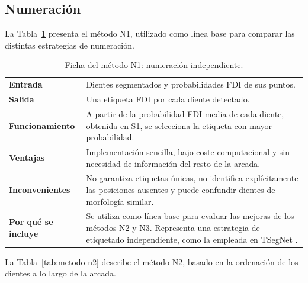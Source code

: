 \subsection{Numeración}
\label{subsec:metodos-numeracion}

La Tabla~\ref{tab:metodo-n1} presenta el método N1, utilizado como línea base para comparar las distintas estrategias de numeración.

\begin{table}[htbp]
    \centering
    \begin{tabular}{p{} >{\raggedright\arraybackslash}p{}}
         \hline 
         \textbf{Entrada} &
         Dientes segmentados y probabilidades FDI de sus puntos. \\

         \textbf{Salida} &
         Una etiqueta FDI por cada diente detectado. \\

         \textbf{Funcionamiento} &
         A partir de la probabilidad FDI media de cada diente, obtenida en S1, se selecciona la etiqueta con mayor probabilidad. \\

         \textbf{Ventajas} &
         Implementación sencilla, bajo coste computacional y sin necesidad de información del resto de la arcada. \\

         \textbf{Inconvenientes} &
         No garantiza etiquetas únicas, no identifica explícitamente las posiciones ausentes y puede confundir dientes de morfología similar. \\

         \textbf{Por qué se incluye} &
         Se utiliza como línea base para evaluar las mejoras de los métodos N2 y N3. Representa una estrategia de etiquetado independiente, como la empleada en TSegNet \cite{cuiTSegNetEfficientAccurate2021}. \\
         \hline
    \end{tabular}
    \caption{Ficha del método N1: numeración independiente.}
    \label{tab:metodo-n1}
\end{table}

La Tabla~\ref{tab:metodo-n2} describe el método N2, basado en la ordenación de los dientes a lo largo de la arcada.


